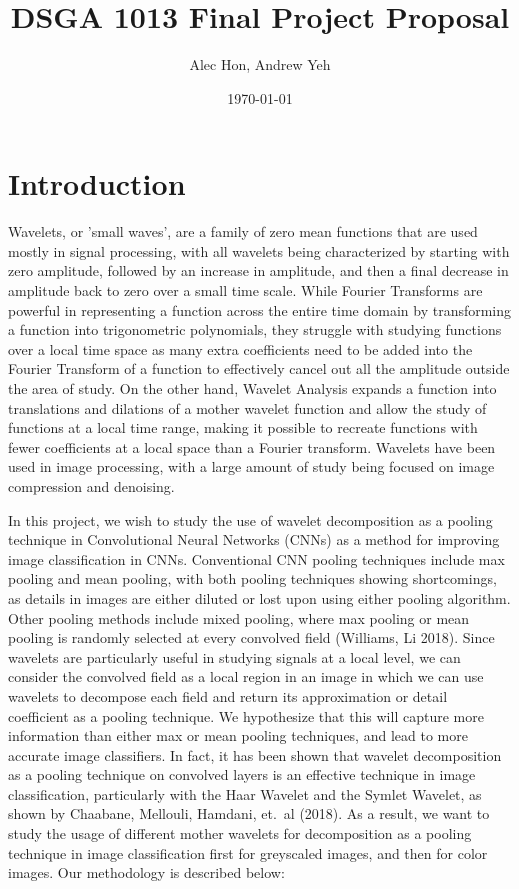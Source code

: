 \documentclass{article}
\begin{document}
\title{\large DSGA 1013 Final Project Proposal}
\author{\small Alec Hon, Andrew Yeh}
\date{\footnotesize \today}
\maketitle

\section{Introduction}

Wavelets, or 'small waves', are a family of zero mean functions that are used mostly in signal processing, with all wavelets being characterized by starting with zero amplitude, followed by an increase in amplitude, and then a final decrease in amplitude back to zero over a small time scale. While Fourier Transforms are powerful in representing a function across the entire time domain by transforming a function into trigonometric polynomials, they struggle with studying functions over a local time space as many extra coefficients need to be added into the Fourier Transform of a function to effectively cancel out all the amplitude outside the area of study. On the other hand, Wavelet Analysis expands a function into translations and dilations of a mother wavelet function and allow the study of functions at a local time range,  making it possible to recreate functions with fewer coefficients at a local space than a Fourier transform. Wavelets have been used in image processing, with a large amount of study being focused on image compression and denoising.  
 \newline
 
\noindent In this project, we wish to study the use of wavelet decomposition as a pooling technique in Convolutional Neural Networks (CNNs) as a method for improving image classification in CNNs. Conventional CNN pooling techniques include max pooling and mean pooling, with both pooling techniques showing shortcomings, as details in images are either diluted or lost upon using either pooling algorithm. Other pooling methods include mixed pooling, where max pooling or mean pooling is randomly selected at every convolved field (Williams, Li 2018). Since wavelets are particularly useful in studying signals at a local level, we can consider the convolved field as a local region in an image in which we can use wavelets to decompose each field and return its approximation or detail coefficient as a pooling technique. We hypothesize that this will capture more information than either max or mean pooling techniques, and lead to more accurate image classifiers. In fact, it has been shown that wavelet decomposition as a pooling technique on convolved layers is an effective technique in image classification, particularly with the Haar Wavelet and the Symlet Wavelet, as shown by Chaabane, Mellouli, Hamdani, et.\ al (2018). As a result, we want to study the usage of different mother wavelets for decomposition as a pooling technique in image classification first for greyscaled images, and then for color images. Our methodology is described below:
\end{document}
